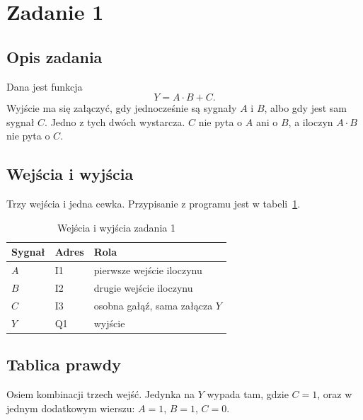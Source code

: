 \newpage
\section{Zadanie 1}

\subsection{Opis zadania}

Dana jest funkcja
\[
Y = A \cdot B + C.
\]
Wyjście ma się załączyć, gdy jednocześnie są sygnały $A$ i $B$, albo gdy jest sam sygnał $C$. Jedno z tych dwóch wystarcza. $C$ nie pyta o $A$ ani o $B$, a iloczyn $A \cdot B$ nie pyta o $C$.

\subsection{Wejścia i wyjścia}

Trzy wejścia i jedna cewka. Przypisanie z programu jest w tabeli~\ref{tab:z1-io}.

\begin{table}[H]
    \centering
    \caption{Wejścia i wyjścia zadania 1}
    \label{tab:z1-io}
    \begin{tabular}{|l|l|p{8.2cm}|}
        \hline
        \textbf{Sygnał} & \textbf{Adres} & \textbf{Rola} \\
        \hline
        $A$ & I1 & pierwsze wejście iloczynu \\
        \hline
        $B$ & I2 & drugie wejście iloczynu \\
        \hline
        $C$ & I3 & osobna gałąź, sama załącza $Y$ \\
        \hline
        $Y$ & Q1 & wyjście \\
        \hline
    \end{tabular}
\end{table}

\subsection{Tablica prawdy}

Osiem kombinacji trzech wejść. Jedynka na $Y$ wypada tam, gdzie $C = 1$, oraz w jednym dodatkowym wierszu: $A = 1$, $B = 1$, $C = 0$.

